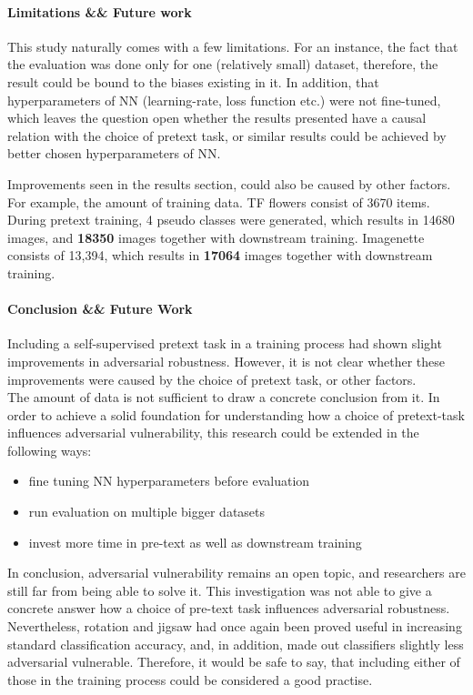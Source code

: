 \paragraph{Limitations \&\& Future work}
This study naturally comes with a few limitations.
For an instance, the fact that the evaluation was done only for one (relatively small) dataset,
therefore, the result could be bound to the biases existing in it.
In addition, that hyperparameters of NN (learning-rate, loss function etc.)
were not fine-tuned, which leaves the question open whether the
results presented have a causal relation with the choice of pretext task,
or similar results could be achieved by better chosen hyperparameters of NN.

Improvements seen in the results section, could also be caused by other factors.
For example, the amount of training data.
TF flowers consist of 3670 items.
During pretext training, 4 pseudo classes were generated,
which results in 14680 images, and \textbf{18350} images together with downstream training.
Imagenette consists of 13,394, which results in \textbf{17064} images together with downstream training.



\paragraph{Conclusion \&\& Future Work}
Including a self-supervised pretext task in a training process had shown slight improvements in adversarial robustness.
However, it is not clear whether these improvements were caused by the choice of pretext task, or other factors.
\\
The amount of data is not sufficient to draw a concrete conclusion from it.
In order to achieve a solid foundation for understanding how a choice of pretext-task influences adversarial vulnerability,
this research could be extended in the following ways:
\begin{itemize}
    \item fine tuning NN hyperparameters before evaluation
    \item run evaluation on multiple bigger datasets
    \item invest more time in pre-text as well as downstream training
\end{itemize}


In conclusion, adversarial vulnerability remains an open topic,
and researchers are still far from being able to solve it.
This investigation was not able to give a concrete answer
how a choice of pre-text task influences adversarial robustness.
\\
Nevertheless, rotation and jigsaw had once again been proved useful in increasing standard classification accuracy,
and, in addition, made out classifiers slightly less adversarial vulnerable.
Therefore, it would be safe to say,
that including either of those in the training process could be considered a good practise.


